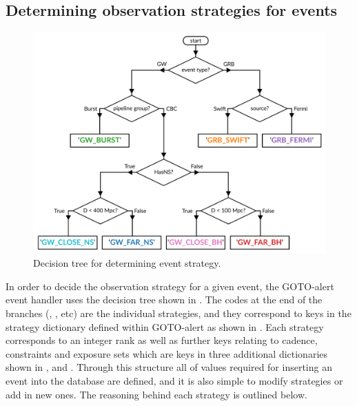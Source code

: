 \begin{colsection}
\begin{colsection}
\end{colsection}


\newpage
\subsection{Determining observation strategies for events}
\label{sec:event_strategy}
\begin{colsection}


\begin{figure}[t]
    \begin{center}
        \includegraphics[width=\linewidth]{images/strategy_flowchart.pdf}
    \end{center}
    \caption[Decision tree for determining event strategy]{
        Decision tree for determining event strategy.
    }\label{fig:strategy_flowchart}
\end{figure}

In order to decide the observation strategy for a given event, the GOTO-alert event handler uses the decision tree shown in . The codes at the end of the branches (, , etc) are the individual strategies, and they correspond to keys in the strategy dictionary defined within GOTO-alert as shown in . Each strategy corresponds to an integer rank as well as further keys relating to cadence, constraints and exposure sets which are keys in three additional dictionaries shown in ,  and .  Through this structure all of values required for inserting an event into the database are defined, and it is also simple to modify strategies or add in new ones. The reasoning behind each strategy is outlined below.


\end{colsection}
\end{colsection}
